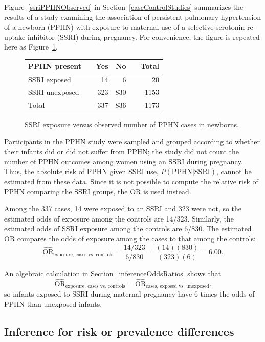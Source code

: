Figure~\ref{ssriPPHNObserved} in Section~\ref{caseControlStudies} summarizes the results of a study examining the association of persistent pulmonary hypertension of a newborn (PPHN) with exposure to maternal use of a selective serotonin re-uptake inhibitor (SSRI) during pregnancy. For convenience, the figure is repeated here as Figure~\ref{ssriPPHNObservedRepeated}.

\begin{figure}[h]
	\centering
	\begin{tabular}{ll rrr r}
		\hline
		PPHN present	 & \hspace{2mm} & Yes & No & \hspace{2mm} & Total \\
		\hline
		SSRI exposed &	& 14 & 6 &  & 20  \\
		SSRI unexposed & & 323 & 830 &  & 1153  \\
        Total & & 337 & 836 & & 1173 \\
		\hline
	\end{tabular}
	\caption{SSRI exposure versus observed number of PPHN cases in newborns.}
    \label{ssriPPHNObservedRepeated}
\end{figure}

Participants in the PPHN study were sampled and grouped according to whether their infants did or did not suffer from PPHN; the study did not count the number of PPHN outcomes among women using an SSRI during pregnancy. Thus, the absolute risk of PPHN given SSRI use, $P(\text{PPHN} | \text{SSRI})$, cannot be estimated from these data.  Since it is not possible to compute the relative risk of PPHN comparing the SSRI groups, the OR is used instead.

Among the 337 cases, 14 were exposed to an SSRI and 323 were not, so the estimated odds of exposure among the controls are 14/323.  Similarly, the estimated odds of SSRI exposure among the controls are 6/830. The estimated OR compares the odds of exposure among the cases to that among the controls:
\[
\widehat{\text{OR}}_{\text{exposure, cases vs. controls}} =  \frac{14/323}{6/830} = \frac{(14)(830)}{(323)(6)} =  6.00.
\]

An algebraic calculation in Section~\ref{inferenceOddsRatios} shows that
\[
\widehat{\text{OR}}_{\text{exposure, cases vs. controls}} =
\widehat{\text{OR}}_{\text{cases, exposed vs. unexposed}}.
\]
so infants exposed to SSRI during maternal pregnancy have 6 times the odds of PPHN than unexposed infants.

\subsection{Inference for risk or prevalence differences}
\label{inferenceRiskDifference}

